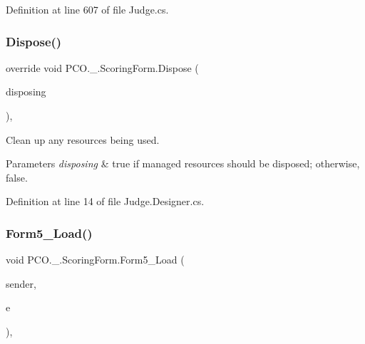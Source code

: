 Definition at line 607 of file Judge.\+cs.

\mbox{\label{classPCO_1_1__0_1_1ScoringForm_aba931e2b82e00f2143ce9c1a19f84986}} 
\subsubsection{\texorpdfstring{Dispose()}{Dispose()}}
{\footnotesize\ttfamily override void P\+C\+O.\+\_.\+Scoring\+Form.\+Dispose (\begin{DoxyParamCaption}\item[{bool}]{disposing }\end{DoxyParamCaption})\hspace{0.3cm}{\ttfamily [inline]}, {\ttfamily [protected]}}



Clean up any resources being used. 


\begin{DoxyParams}{Parameters}
{\em disposing} & true if managed resources should be disposed; otherwise, false.\\
\hline
\end{DoxyParams}


Definition at line 14 of file Judge.\+Designer.\+cs.

\mbox{\label{classPCO_1_1__0_1_1ScoringForm_a58f4b35c1ec7a0f9480d832f50778891}} 
\subsubsection{\texorpdfstring{Form5\+\_\+\+Load()}{Form5\_Load()}}
{\footnotesize\ttfamily void P\+C\+O.\+\_.\+Scoring\+Form.\+Form5\+\_\+\+Load (\begin{DoxyParamCaption}\item[{object}]{sender,  }\item[{Event\+Args}]{e }\end{DoxyParamCaption})\hspace{0.3cm}{\ttfamily [inline]}, {\ttfamily [private]}}



